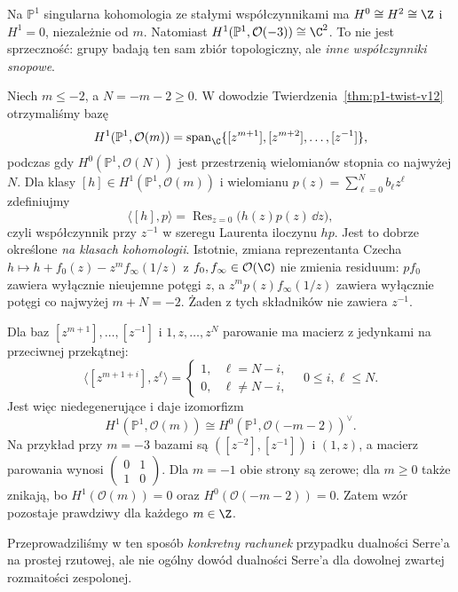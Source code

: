\begin{uwaga}
Na $\mathbb P^1$ singularna kohomologia ze stałymi
współczynnikami ma $H^0\cong H^2\cong\Z$ i
$H^1=0$, niezależnie od $m$. Natomiast
$H^1(\mathbb P^1,\mathcal O(-3))\cong\C^2$.
To nie jest sprzeczność: grupy badają ten sam
zbiór topologiczny, ale \emph{inne współczynniki snopowe}.
\end{uwaga}


\begin{przyklad}
\label{prz:p1-serre-residue}
Niech $m\le-2$, a $N=-m-2\ge0$.
W dowodzie Twierdzenia~\ref{thm:p1-twist-v12}
otrzymaliśmy bazę
\[
 H^1(\mathbb P^1,\mathcal O(m))
 =\operatorname{span}_{\C}
   \{[z^{m+1}],[z^{m+2}],\ldots,[z^{-1}]\},
\]
podczas gdy
$H^0(\mathbb P^1,\mathcal O(N))$
jest przestrzenią wielomianów stopnia co najwyżej $N$.
Dla klasy $[h]\in H^1(\mathbb P^1,\mathcal O(m))$
i wielomianu $p(z)=\sum_{\ell=0}^N b_\ell z^\ell$
zdefiniujmy
\[
 \langle[h],p\rangle
  =\operatorname{Res}_{z=0}
     \bigl(h(z)p(z)\,\dd z\bigr),
\]
czyli współczynnik przy $z^{-1}$ w szeregu Laurenta
iloczynu $hp$. Jest to dobrze określone
\emph{na klasach kohomologii}.
Istotnie, zmiana reprezentanta Czecha
$h\mapsto h+f_0(z)-z^m f_\infty(1/z)$
z $f_0,f_\infty\in\mathcal O(\C)$ nie zmienia residuum:
$p f_0$ zawiera wyłącznie nieujemne potęgi $z$,
a $z^m p(z)f_\infty(1/z)$ zawiera wyłącznie
potęgi co najwyżej $m+N=-2$.
Żaden z tych składników nie zawiera $z^{-1}$.

Dla baz $[z^{m+1}],\ldots,[z^{-1}]$
i $1,z,\ldots,z^N$ parowanie ma macierz
z jedynkami na przeciwnej przekątnej:
\[
 \bigl\langle[z^{m+1+i}],z^\ell\bigr\rangle
 =\begin{cases}
  1,&\ell=N-i,\\
  0,&\ell\ne N-i,
 \end{cases}
 \quad 0\le i,\ell\le N.
\]
Jest więc niedegenerujące i daje izomorfizm
\[
 H^1(\mathbb P^1,\mathcal O(m))
 \cong H^0(\mathbb P^1,\mathcal O(-m-2))^\vee.
\]
Na przykład przy $m=-3$ bazami są
$([z^{-2}],[z^{-1}])$ i $(1,z)$,
a macierz parowania wynosi
$\left(\begin{smallmatrix}0&1\\1&0\end{smallmatrix}\right)$.
Dla $m=-1$ obie strony są zerowe;
dla $m\ge0$ także znikają, bo
$H^1(\mathcal O(m))=0$
oraz $H^0(\mathcal O(-m-2))=0$.
Zatem wzór pozostaje prawdziwy dla każdego $m\in\Z$.

Przeprowadziliśmy w ten sposób \emph{konkretny rachunek}
przypadku dualności Serre'a na prostej rzutowej,
ale nie ogólny dowód dualności Serre'a
dla dowolnej zwartej rozmaitości zespolonej.
\end{przyklad}

